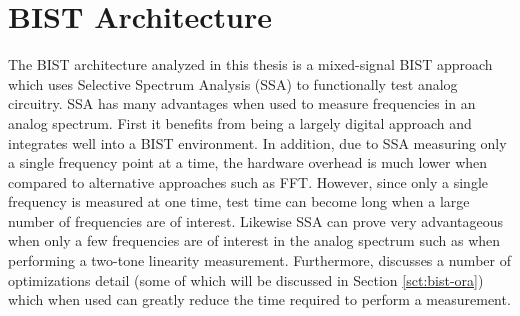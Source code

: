 \documentclass[12pt]{report}
\begin{document}
\section{BIST Architecture}
The BIST architecture analyzed in this thesis is a mixed-signal BIST approach which uses Selective Spectrum Analysis (SSA) to functionally test analog circuitry\cite{jie-journal}.  SSA has many advantages when used to measure frequencies in an analog spectrum.  First it benefits from being a largely digital approach and integrates well into a BIST environment.  In addition, due to SSA measuring only a single frequency point at a time, the hardware overhead is much lower when compared to alternative approaches such as FFT\cite{stroud-phase}. However, since only a single frequency is measured at one time, test time can become long when a large number of frequencies are of interest.  Likewise SSA can prove very advantageous when only a few frequencies are of interest in the analog spectrum such as when performing a two-tone linearity measurement\cite{jie-journal}.  Furthermore, \cite{jie} discusses a number of optimizations detail (some of which will be discussed in Section \ref{sct:bist-ora}) which when used can greatly reduce the time required to perform a measurement.
\end{document}

